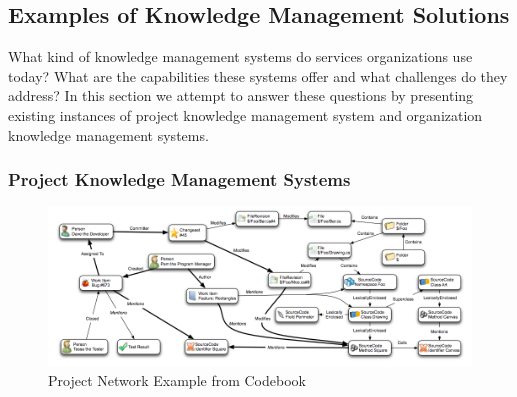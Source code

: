 \subsection{Examples of Knowledge Management Solutions}

What kind of knowledge management systems do services organizations use today? What are the capabilities these systems offer and what challenges do they address? In this section we attempt to answer these questions by presenting existing instances of project knowledge management system and organization knowledge management systems. 

\subsubsection{Project Knowledge Management Systems} 

\begin{figure}
	\center
	\includegraphics[scale=0.4]{figs/codebook.png}
	\caption{Project Network Example from Codebook}
	\label{fig-codebook}
\end{figure}


